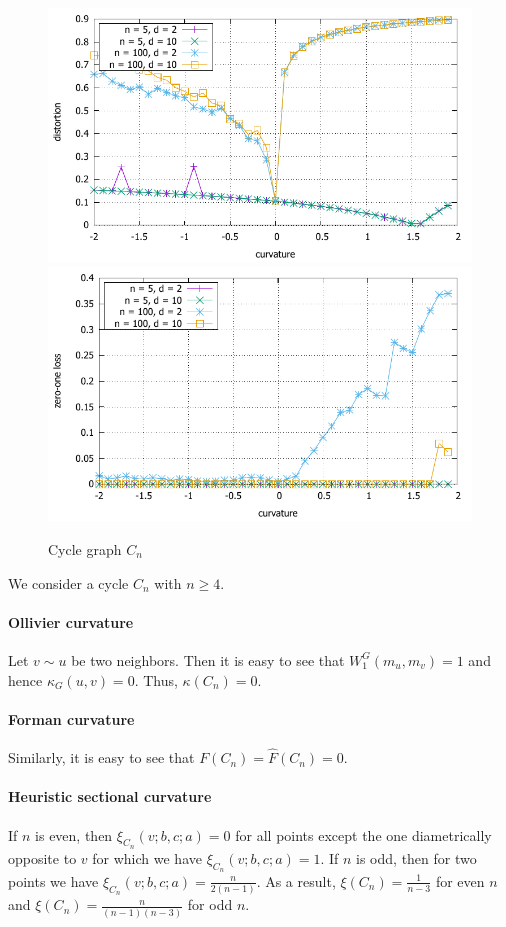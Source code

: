 \documentclass{article} %
\begin{document}
\begin{figure}
    \centering
    \includegraphics[width = 0.49 \textwidth]{cycle_distortion.pdf}
    \includegraphics[width = 0.49 \textwidth]{cycle_zero_one.pdf}
    \caption{Cycle graph $C_{n}$}
    \label{fig:cycle}
\end{figure}

We consider a cycle $C_n$ with $n \ge 4$.

\paragraph{Ollivier curvature}  
Let $v \sim u$ be two neighbors. Then it is easy to see that $W_1^G(m_u,m_v) = 1$ and hence $\kappa_G(u,v) = 0$. Thus, $\kappa(C_n) = 0$.

\paragraph{Forman curvature} 

Similarly, it is easy to see that $F(C_n) = \hat F(C_n) = 0$.


\paragraph{Heuristic sectional curvature} If $n$ is even, then $\xi_{C_n}(v;b,c;a) = 0$ for all points except the one diametrically opposite to $v$ for which we have $\xi_{C_n}(v;b,c;a) = 1$. If $n$ is odd, then for two points we have $\xi_{C_n}(v;b,c;a) = \frac{n}{2(n-1)}$. As a result, $\xi(C_n) = \frac{1}{n-3}$ for even $n$ and $\xi(C_n) = \frac{n}{(n-1)(n-3)}$ for odd $n$.
\end{document}
